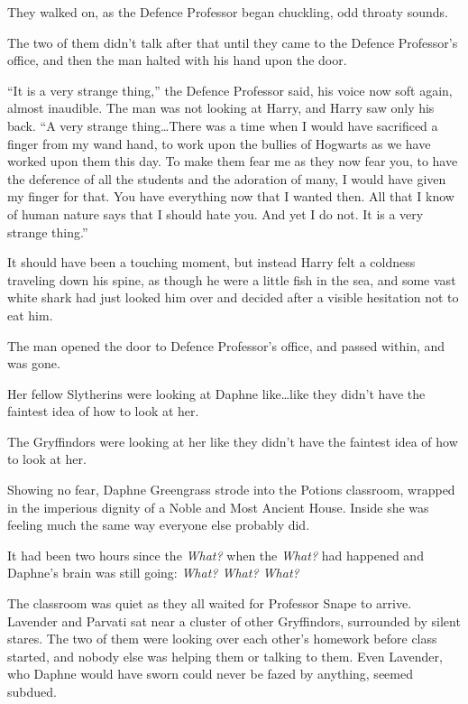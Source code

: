 They walked on, as the Defence Professor began chuckling, odd throaty sounds.

The two of them didn’t talk after that until they came to the Defence Professor’s office, and then the man halted with his hand upon the door.

“It is a very strange thing,” the Defence Professor said, his voice now soft again, almost inaudible. The man was not looking at Harry, and Harry saw only his back. “A very strange thing…There was a time when I would have sacrificed a finger from my wand hand, to work upon the bullies of Hogwarts as we have worked upon them this day. To make them fear me as they now fear you, to have the deference of all the students and the adoration of many, I would have given my finger for that. You have everything now that I wanted then. All that I know of human nature says that I should hate you. And yet I do not. It is a very strange thing.”

It should have been a touching moment, but instead Harry felt a coldness traveling down his spine, as though he were a little fish in the sea, and some vast white shark had just looked him over and decided after a visible hesitation not to eat him.

The man opened the door to Defence Professor’s office, and passed within, and was gone.


Her fellow Slytherins were looking at Daphne like…like they didn’t have the faintest idea of how to look at her.

The Gryffindors were looking at her like they didn’t have the faintest idea of how to look at her.

Showing no fear, Daphne Greengrass strode into the Potions classroom, wrapped in the imperious dignity of a Noble and Most Ancient House. Inside she was feeling much the same way everyone else probably did.

It had been two hours since the \emph{What?} when the \emph{What?} had happened and Daphne’s brain was still going: \emph{What? What? What?}

The classroom was quiet as they all waited for Professor Snape to arrive. Lavender and Parvati sat near a cluster of other Gryffindors, surrounded by silent stares. The two of them were looking over each other’s homework before class started, and nobody else was helping them or talking to them. Even Lavender, who Daphne would have sworn could never be fazed by anything, seemed subdued.

